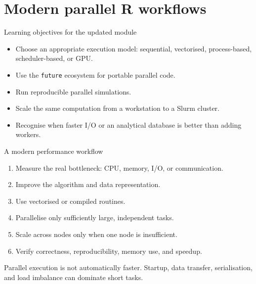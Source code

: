 
\section{Modern parallel R workflows}

\begin{frame}{Learning objectives for the updated module}
\begin{itemize}
  \item Choose an appropriate execution model: sequential, vectorised, process-based, scheduler-based, or GPU.
  \item Use the \texttt{future} ecosystem for portable parallel code.
  \item Run reproducible parallel simulations.
  \item Scale the same computation from a workstation to a Slurm cluster.
  \item Recognise when faster I/O or an analytical database is better than adding workers.
\end{itemize}
\end{frame}

\begin{frame}{A modern performance workflow}
\begin{enumerate}
  \item Measure the real bottleneck: CPU, memory, I/O, or communication.
  \item Improve the algorithm and data representation.
  \item Use vectorised or compiled routines.
  \item Parallelise only sufficiently large, independent tasks.
  \item Scale across nodes only when one node is insufficient.
  \item Verify correctness, reproducibility, memory use, and speedup.
\end{enumerate}
\vspace{0.2cm}
\alert{Parallel execution is not automatically faster.} Startup, data transfer, serialisation, and load imbalance can dominate short tasks.
\end{frame}

